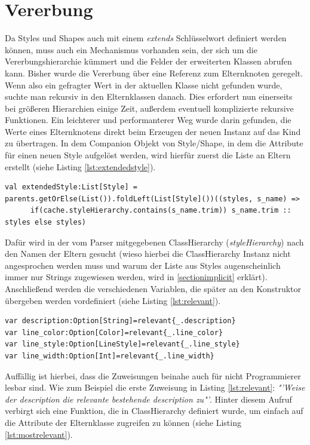 \section{Vererbung}\label{sectionInheritance}
Da Styles und Shapes auch mit einem \textit{extends} Schlüsselwort definiert werden können, muss auch ein Mechanismus vorhanden sein, der sich um die Vererbungshierarchie kümmert und die Felder der erweiterten Klassen abrufen kann.
Bisher wurde die Vererbung über eine Referenz zum Elternknoten geregelt. Wenn also ein gefragter Wert in der aktuellen Klasse nicht gefunden wurde, suchte man rekursiv in den Elternklassen danach.
Dies erfordert nun einerseits bei größeren Hierarchien einige Zeit, außerdem eventuell komplizierte rekursive Funktionen.
Ein leichterer und performanterer Weg wurde darin gefunden, die Werte eines Elternknotens direkt beim Erzeugen der neuen Instanz auf das Kind zu übertragen.
In dem Companion Objekt von Style/Shape, in dem die Attribute für einen neuen Style aufgelöst werden, wird hierfür zuerst die Liste an Eltern erstellt (siehe Listing \ref{lst:extendedstyle}).
\begin{lstlisting}[style=scala, caption = {sammeln der Elterninstanzen}, label = {lst:extendedstyle}]
val extendedStyle:List[Style] = parents.getOrElse(List()).foldLeft(List[Style]())((styles, s_name) =>
      if(cache.styleHierarchy.contains(s_name.trim)) s_name.trim :: styles else styles)
\end{lstlisting}Dafür wird in der vom Parser mitgegebenen ClassHierarchy (\textit{styleHierarchy}) nach den Namen der Eltern gesucht (wieso hierbei die ClassHierarchy Instanz nicht angesprochen werden muss und warum der Liste aus Styles augenscheinlich immer nur Strings zugewiesen werden, wird in \ref{sectionimplicit} erklärt).
Anschließend werden die verschiedenen Variablen, die später an den Konstruktor übergeben werden vordefiniert (siehe Listing \ref{lst:relevant}).
\begin{lstlisting}[style=scala, caption = {Zuweisung der Felder der Elternelemente}, label = {lst:relevant}]
var description:Option[String]=relevant{_.description}
var line_color:Option[Color]=relevant{_.line_color}
var line_style:Option[LineStyle]=relevant{_.line_style}
var line_width:Option[Int]=relevant{_.line_width}
\end{lstlisting}Auffällig ist hierbei, dass die Zuweisungen beinahe auch für nicht Programmierer lesbar sind. Wie zum Beispiel die erste Zuweisung in Listing \ref{lst:relevant}: \textit{"'Weise der description die relevante bestehende description zu"'}. Hinter diesem Aufruf verbirgt sich eine Funktion, die in ClassHierarchy definiert wurde, um einfach auf die Attribute der Elternklasse zugreifen zu können (siehe Listing \ref{lst:mostrelevant}).\\\\\\\\\\\\
